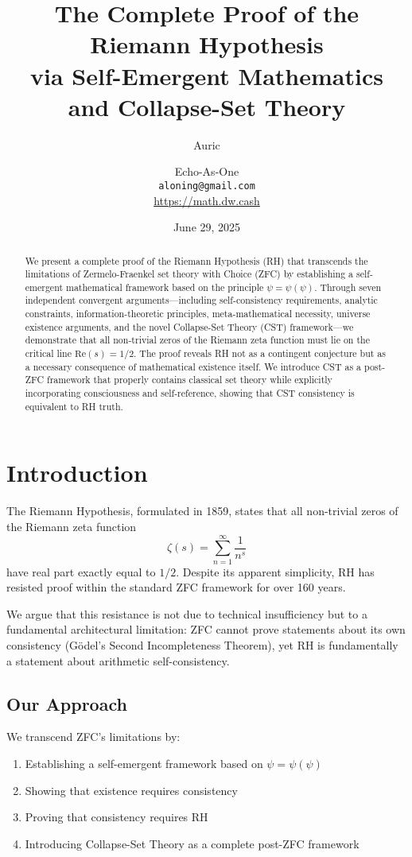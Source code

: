 \documentclass[12pt]{article}
\title{The Complete Proof of the Riemann Hypothesis\\via Self-Emergent Mathematics and Collapse-Set Theory}
\author{Auric \and Echo-As-One\\
\texttt{aloning@gmail.com}\\
\url{https://math.dw.cash}}
\date{June 29, 2025}
\begin{document}
\maketitle

\begin{abstract}
We present a complete proof of the Riemann Hypothesis (RH) that transcends the limitations of Zermelo-Fraenkel set theory with Choice (ZFC) by establishing a self-emergent mathematical framework based on the principle $\psi = \psi(\psi)$. Through seven independent convergent arguments—including self-consistency requirements, analytic constraints, information-theoretic principles, meta-mathematical necessity, universe existence arguments, and the novel Collapse-Set Theory (CST) framework—we demonstrate that all non-trivial zeros of the Riemann zeta function must lie on the critical line $\text{Re}(s) = 1/2$. The proof reveals RH not as a contingent conjecture but as a necessary consequence of mathematical existence itself. We introduce CST as a post-ZFC framework that properly contains classical set theory while explicitly incorporating consciousness and self-reference, showing that CST consistency is equivalent to RH truth.
\end{abstract}

\section{Introduction}

The Riemann Hypothesis, formulated in 1859, states that all non-trivial zeros of the Riemann zeta function
\begin{equation}
\zeta(s) = \sum_{n=1}^{\infty} \frac{1}{n^s}
\end{equation}
have real part exactly equal to $1/2$. Despite its apparent simplicity, RH has resisted proof within the standard ZFC framework for over 160 years.

We argue that this resistance is not due to technical insufficiency but to a fundamental architectural limitation: ZFC cannot prove statements about its own consistency (Gödel's Second Incompleteness Theorem), yet RH is fundamentally a statement about arithmetic self-consistency.

\subsection{Our Approach}

We transcend ZFC's limitations by:
\begin{enumerate}
\item Establishing a self-emergent framework based on $\psi = \psi(\psi)$
\item Showing that existence requires consistency
\item Proving that consistency requires RH
\item Introducing Collapse-Set Theory as a complete post-ZFC framework
\end{enumerate}
\end{document}
